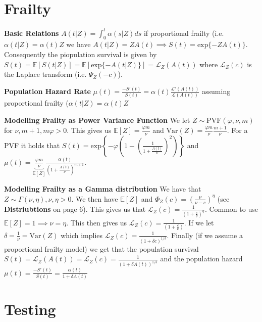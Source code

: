 \documentclass{article}
\begin{document}
\newpage

\section*{Frailty}

\textbf{Basic Relations}  $A(t|Z) = \int_0^t \alpha(s|Z)ds$ if proportional frailty (i.e. $\alpha(t|Z) = \alpha(t)Z$ we have $A(t|Z) = ZA(t) \implies S(t) = \text{exp}\{-ZA(t)\}$. Consequently the piopulation survival is given by $S(t) = \mathbb{E}[S(t|Z)] = \mathbb{E}\left[\text{exp}\{-A(t|Z)\}\right] = \mathcal{L}_Z(A(t))$ where $\mathcal{L}_Z(c)$ is the Laplace transform (i.e. $\Psi_Z(-c)$).

\medskip

\textbf{Population Hazard Rate} $\mu(t) = \frac{-S'(t)}{S(t)} = \alpha(t)\frac{\mathcal{L}'(A(t))}{\mathcal{L}(A(t))}$ assuming proportional frailty ($\alpha(t|Z) = \alpha(t)Z$

\medskip 

\textbf{Modelling Frailty as Power Variance Function} We let $Z \sim \text{PVF}(\varphi, \nu, m)$ for $\nu, m + 1, m\varphi > 0$. This gives us $\mathbb{E}[Z] = \frac{\varphi m}{\nu}$ and $\text{Var}(Z) = \frac{\varphi m}{\nu}\frac{m + 1}{\nu}$. For a PVF it holds that $S(t) = \text{exp}\left\{-\varphi\left(1- \left(\frac{1}{1 + \frac{A(t)}{\nu}}\right)^2\right)\right\}$ and $\mu(t) = \underbrace{\frac{\varphi m}{\nu}}_{\mathbb{E}[Z]}\frac{\alpha(t)}{\left(1+\frac{A(t)}{\nu}\right)^{m+1}}$. 

\textbf{Modelling Frailty as a Gamma distribution}
We have that $Z\sim \Gamma(\nu, \eta), \nu,\eta > 0$. We then have $\mathbb{E}[Z]$ and $\Phi_Z(c) = \left(\frac{\nu}{\nu-c}\right)^\eta$ (see \textbf{Distriubtions} on page 6). This gives us that $\mathcal{L}_Z(c) = \frac{1}{\left(1 + \frac{c}{\nu}\right)^\eta}$. Common to use $\mathbb{E}[Z] = 1 \implies \nu = \eta$. This then gives us $\mathcal{L}_Z(c) = \frac{1}{\left(1+\frac{c}{\nu}\right)}$. If we let $\delta = \frac{1}{\nu} = \text{Var}(Z)$ which implies $\mathcal{L}_Z(c) = \frac{1}{\left(1+\delta c\right)^{1/\delta}}$. Finally (if we assume a proportional frailty model) we get that the population survival $S(t) = \mathcal{L}_Z(A(t)) = \mathcal{L}_Z(c) = \frac{1}{\left(1+\delta A(t)\right)^{1/\delta}}$ and the population hazard $\mu(t) = \frac{-S'(t)}{S(t)} = \frac{\alpha(t)}{1 + \delta A(t)}$

\newpage

\section*{Testing}
\end{document}
